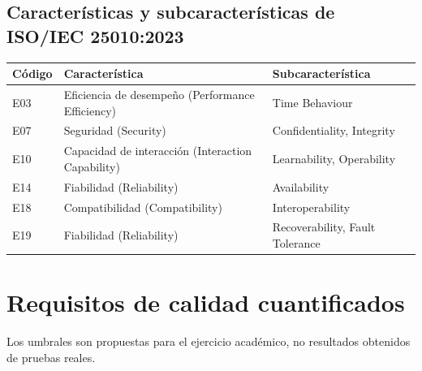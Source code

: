 \documentclass[11pt,a4paper]{article}
\begin{document}
\subsection{Características y subcaracterísticas de ISO/IEC 25010:2023}

{\small
\setlength{\tabcolsep}{4pt}
\begin{tabular}{L{1.5cm}L{6.0cm}L{6.0cm}}
\toprule
\textbf{Código} & \textbf{Característica} & \textbf{Subcaracterística} \\
\midrule
E03 & Eficiencia de desempeño (Performance Efficiency) & Time Behaviour \\
E07 & Seguridad (Security) & Confidentiality, Integrity \\
E10 & Capacidad de interacción (Interaction Capability) & Learnability, Operability \\
E14 & Fiabilidad (Reliability) & Availability \\
E18 & Compatibilidad (Compatibility) & Interoperability \\
E19 & Fiabilidad (Reliability) & Recoverability, Fault Tolerance \\
\bottomrule
\end{tabular}
}

\section{Requisitos de calidad cuantificados}

Los umbrales son propuestas para el ejercicio académico, no resultados obtenidos de pruebas reales.
\end{document}
